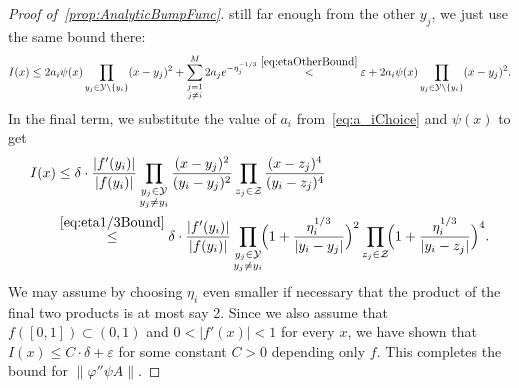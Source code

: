\documentclass[12pt,]{article}
\def\cref#1{\ref{#1}}%
\theoremstyle{definition}
\theoremstyle{remark}
\newcommand{\0}{\mathbf{0}}
\begin{document}
{\begin{proof}[Proof of~\cref{prop:AnalyticBumpFunc}]
still far enough from the other $y_j$, we just use the same bound there:
\begin{equation*}
	I(x) \leq 2a_i \psi(x) \prod_{y_j\in\mathcal{Y}\setminus\{y_i\}} (x-y_j)^2 +
	\sum_{\substack{j=1 \\ j\neq i}}^{M} 2a_j e^{-\eta_j^{-1/3}}
	\stackrel{\eqref{eq:etaOtherBound}}{<} \varepsilon + 2a_i \psi(x)
	\prod_{y_j\in\mathcal{Y}\setminus\{y_i\}} (x-y_j)^2.
\end{equation*}
In the final term, we substitute the value of $a_i$ from~\cref{eq:a_iChoice} and $\psi(x)$ to get
\begin{align*}
	I(x)&\leq \delta \cdot \frac{|f'(y_i)|}{|f(y_i)|} \prod_{\substack{y_j\in\mathcal{Y} \\
	y_j\neq y_i}} \frac{(x-y_j)^2}{(y_i - y_j)^2}  \prod_{z_j\in\mathcal{Z}}
	\frac{(x-z_j)^4}{(y_i - z_j)^4} \\
	&\stackrel{\eqref{eq:eta1/3Bound}}{\leq}  \delta \cdot
	\frac{|f'(y_i)|}{|f(y_i)|}\prod_{\substack{y_j\in\mathcal{Y} \\ y_j\neq y_i}}\!\! \Big(
	1+\frac{\eta_i^{1/3}}{|y_i-y_j|} \Big)^2 \prod_{z_j\in\mathcal{Z}}\!\! \Big(
      1+\frac{\eta_i^{1/3}}{|y_i-z_j|} \Big)^4. 
\end{align*}
We may assume by choosing $\eta_i$ even smaller if necessary that the product of the final two
products is at most say 2. Since we also assume that $f([0,1])\subset (0,1)$ and $0<|f'(x)|<1$ for
every $x$, we have shown that $I(x)\leq C\cdot\delta+\varepsilon$ for some constant $C>0$ depending
only $f$. This completes the bound for $\| \varphi'' \psi A\|$. 
\end{proof}

\begin{comment}"Old proof, really the same, just got slightly restructured"
\begin{proof}[Proof of~\cref{prop:AnalyticBumpFunc}]
The argument is essentially a careful analysis of the function $g$ defined in~\cref{eq:BumpFunc} with the choice 
\begin{equation}\label{eq:a_iChoice}
a_i = \frac{\delta \cdot |f'(y_i)|}{2  \cdot |f(y_i)|}
\Big(\prod_{y_j\in\mathcal{Y}\setminus\{y_i\}} (y_i - y_j)^2 \cdot \prod_{z_j\in\mathcal{Z}} (y_i -
z_j)^4 \Big)^{-1}
\end{equation}
and 
\begin{equation}\label{eq:eta_iBound1}
\eta_i\leq \min\bigg\{ \underbrace{\frac{\varepsilon \cdot C(2,0)}{M a_i}}_{(C1)},\;
\underbrace{\Big(\frac{\varepsilon e^{1/2}\sqrt{2}}{2M^2 a_i}\Big)^2}_{(C2)},\;
\underbrace{\frac{\varepsilon e}{4QMa_i}}_{(C3)},\; \underbrace{\Big( \frac{\varepsilon (2e/3)^{3/2}
}{2 Ma_i} \Big)^2}_{(C4)} \bigg\}
\end{equation}
for every $i=1,\ldots,M$. We will make further compatible restrictions on $\eta_i$ later in the proof.


\end{comment}}
\end{document}
